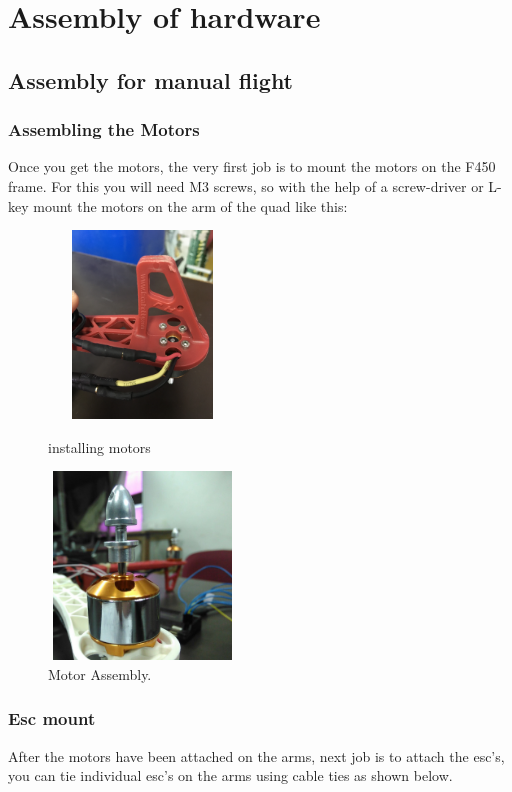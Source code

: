 \documentclass[a4paper,12pt,oneside]{book}
\begin{document}
\section{Assembly of hardware}
	 \subsection{Assembly for manual flight}
	 \subsubsection{Assembling the Motors}
	 	Once you get the motors, the very first job is to mount the motors on the F450 frame. For this you will need M3 screws, so with the help of a screw-driver or L-key mount the motors on the arm of the quad like this:
	 	\begin{figure}[H]
	 	
	 	\centering
		\includegraphics[width=5cm,height=5cm]{Screw}
		\caption{installing motors}
	 	\includegraphics[width=5cm,height=5cm]{mot}
	 	\caption{Motor Assembly.}
\end{figure}
	 	\subsubsection{Esc mount}
	 	After the motors have been attached on the arms, next job is to attach the esc's, you can tie individual esc's on the arms using cable ties as shown below.
		 	
\end{document}
